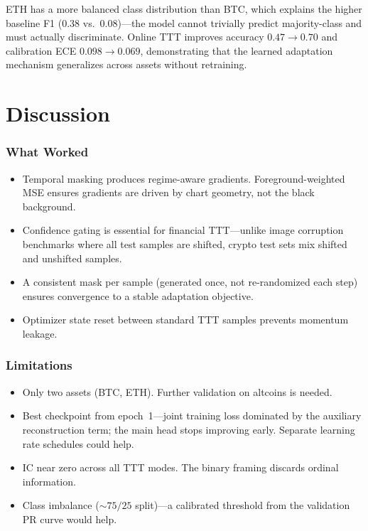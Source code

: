 \documentclass[11pt]{article}
\begin{document}
ETH has a more balanced class distribution than BTC, which explains the higher baseline F1
(0.38 vs.\ 0.08)---the model cannot trivially predict majority-class and must actually
discriminate. Online TTT improves accuracy $0.47 \rightarrow 0.70$ and calibration ECE
$0.098 \rightarrow 0.069$, demonstrating that the learned adaptation mechanism generalizes
across assets without retraining.

\section{Discussion}
\label{sec:discussion}

\subsubsection*{What Worked}

\begin{itemize}[nosep,leftmargin=1.2em]
  \item Temporal masking produces regime-aware gradients. Foreground-weighted MSE ensures
    gradients are driven by chart geometry, not the black background.
  \item Confidence gating is essential for financial TTT---unlike image corruption
    benchmarks where all test samples are shifted, crypto test sets mix shifted and
    unshifted samples.
  \item A consistent mask per sample (generated once, not re-randomized each step) ensures
    convergence to a stable adaptation objective.
  \item Optimizer state reset between standard TTT samples prevents momentum leakage.
\end{itemize}

\subsubsection*{Limitations}

\begin{itemize}[nosep,leftmargin=1.2em]
  \item Only two assets (BTC, ETH). Further validation on altcoins is needed.
  \item Best checkpoint from epoch~1---joint training loss dominated by the auxiliary
    reconstruction term; the main head stops improving early. Separate learning rate
    schedules could help.
  \item IC near zero across all TTT modes. The binary framing discards ordinal information.
  \item Class imbalance (${\sim}75/25$ split)---a calibrated threshold from the validation
    PR curve would help.
\end{itemize}
\end{document}
